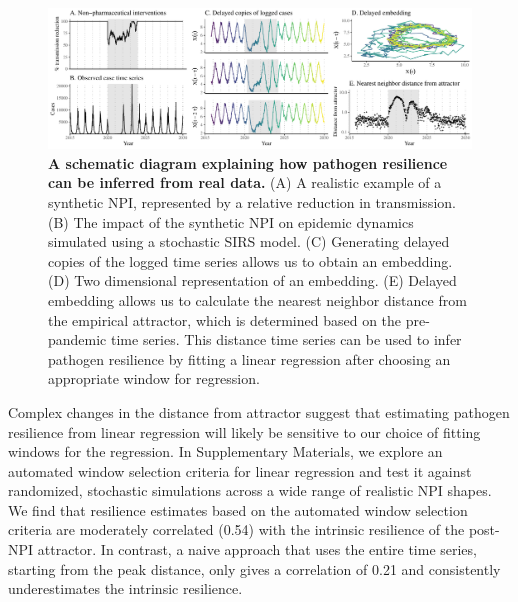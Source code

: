 \documentclass[12pt]{article}
\begin{document}
\begin{figure}[!ht]
\includegraphics[width=\textwidth]{../figure3/figure3.pdf}
\caption{
\textbf{A schematic diagram explaining how pathogen resilience can be inferred from real data.}
(A) A realistic example of a synthetic NPI, represented by a relative reduction in transmission.
(B) The impact of the synthetic NPI on epidemic dynamics simulated using a stochastic SIRS model.
(C) Generating delayed copies of the logged time series allows us to obtain an embedding.
(D) Two dimensional representation of an embedding.
(E) Delayed embedding allows us to calculate the nearest neighbor distance from the empirical attractor, which is determined based on the pre-pandemic time series.
This distance time series can be used to infer pathogen resilience by fitting a linear regression after choosing an appropriate window for regression.
}
\end{figure}

Complex changes in the distance from attractor suggest that estimating pathogen resilience from linear regression will likely be sensitive to our choice of fitting windows for the regression.
In Supplementary Materials, we explore an automated window selection criteria for linear regression and test it against randomized, stochastic simulations across a wide range of realistic NPI shapes.
We find that resilience estimates based on the automated window selection criteria are moderately correlated (0.54) with the intrinsic resilience of the post-NPI attractor.
In contrast, a naive approach that uses the entire time series, starting from the peak distance, only gives a correlation of 0.21 and consistently underestimates the intrinsic resilience.

\end{document}

